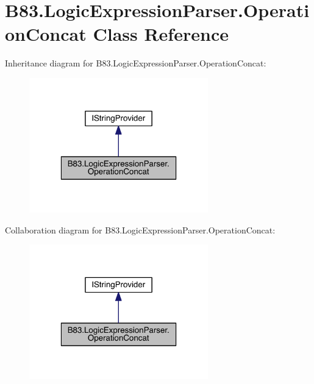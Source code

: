 \hypertarget{class_b83_1_1_logic_expression_parser_1_1_operation_concat}{}\section{B83.\+Logic\+Expression\+Parser.\+Operation\+Concat Class Reference}
\label{class_b83_1_1_logic_expression_parser_1_1_operation_concat}


Inheritance diagram for B83.\+Logic\+Expression\+Parser.\+Operation\+Concat\+:\nopagebreak
\begin{figure}[H]
\begin{center}
\leavevmode
\includegraphics[width=220pt]{class_b83_1_1_logic_expression_parser_1_1_operation_concat__inherit__graph}
\end{center}
\end{figure}


Collaboration diagram for B83.\+Logic\+Expression\+Parser.\+Operation\+Concat\+:\nopagebreak
\begin{figure}[H]
\begin{center}
\leavevmode
\includegraphics[width=220pt]{class_b83_1_1_logic_expression_parser_1_1_operation_concat__coll__graph}
\end{center}
\end{figure}
